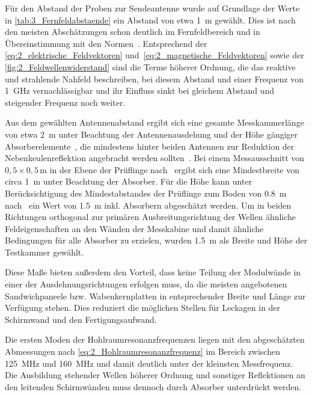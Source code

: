 Für den Abstand der Proben zur Sendeantenne wurde auf Grundlage der Werte in \Tabelle\ref{tab:3_Fernfeldabstaende} ein Abstand von etwa \SI{1}{\meter} gewählt. Dies ist nach den meisten Abschätzungen schon deutlich im Fernfeldbereich und in Übereinstimmung mit den Normen~\cite{DIN_EN_61000-4-3, VG_95373_15}. Entsprechend der \Gleichungen\eqref{eq:2_elektrische_Feldvektoren} und~\eqref{eq:2_magnetische_Feldvektoren} sowie der \Abb\ref{fig:2_Feldwellenwiderstand} sind die Terme höherer Ordnung, die das reaktive und strahlende Nahfeld beschreiben, bei diesem Abstand und einer Frequenz von \SI{1}{\giga\hertz} vernachlässigbar und ihr Einfluss sinkt bei gleichem Abstand und steigender Frequenz noch weiter. 
\par
\vspace{\linespace}
Aus dem gewählten Antennenabstand ergibt sich eine gesamte Messkammerlänge von etwa \SI{2}{\meter} unter Beachtung der Antennenausdehung und der Höhe gängiger Absorberelemente~\cite{Telemeter_Produktseite, EMV-Support_Produktseite}, die mindestens hinter beiden Antennen zur Reduktion der Nebenkeulenreflektion angebracht werden sollten~\cite{Optimierung_Feldhomogenitaet, EM_Schirmung}. Bei einem Messausschnitt von $0,5 \times 0,5\,\si{\meter}$ in der Ebene der Prüflinge nach~\cite{DIN_EN_61000-4-3} ergibt sich eine Mindestbreite von circa \SI{1}{\meter} unter Beachtung der Absorber. Für die Höhe kann unter Berücksichtigung des Mindestabstandes der Prüflinge zum Boden von \SI{0,8}{\meter} nach~\cite{DIN_EN_61000-4-3, DIN_EN_61000-5-7} ein Wert von \SI{1,5}{\meter} inkl. Absorbern abgeschätzt werden. Um in beiden Richtungen orthogonal zur primären Ausbreitungsrichtung der Wellen ähnliche Feldeigenschaften an den Wänden der Messkabine und damit ähnliche Bedingungen für alle Absorber zu erzielen, wurden \SI{1,5}{\meter} als Breite und Höhe der Testkammer gewählt. 
\par
\vspace{\linespace}
Diese Maße bieten außerdem den Vorteil, dass keine Teilung der Modulwände in einer der Ausdehnungsrichtungen erfolgen muss, da die meisten angebotenen Sandwichpaneele bzw. Wabenkernplatten in entsprechender Breite und Länge zur Verfügung stehen. Dies reduziert die möglichen Stellen für Leckagen in der Schirmwand und den Fertigungsaufwand.
\par
\vspace{\linespace}
Die ersten Moden der Hohlraumresonanzfrequenzen liegen mit den abgeschätzten Abmessungen nach \Gleichung\eqref{eq:2_Hohlraumresonanzfrequenz} im Bereich zwischen \SI{125}{\mega\hertz} und \SI{160}{\mega\hertz} und damit deutlich unter der kleinsten Messfrequenz. Die Ausbildung stehender Wellen höherer Ordnung und sonstiger Reflektionen an den leitenden Schirmwänden muss dennoch durch Absorber unterdrückt werden.
